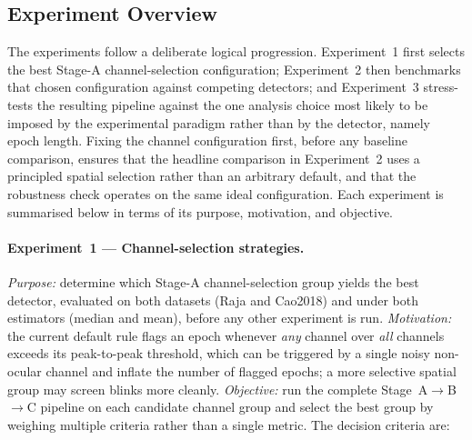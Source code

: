 \subsection{Experiment Overview}
\label{sec:experiment_overview}

The experiments follow a deliberate logical progression. Experiment~1 first selects the
best Stage-A channel-selection configuration; Experiment~2 then benchmarks that chosen
configuration against competing detectors; and Experiment~3 stress-tests the resulting
pipeline against the one analysis choice most likely to be imposed by the experimental
paradigm rather than by the detector, namely epoch length. Fixing the channel
configuration first, before any baseline comparison, ensures that the headline comparison
in Experiment~2 uses a principled spatial selection rather than an arbitrary default, and
that the robustness check operates on the same ideal configuration. Each experiment is
summarised below in terms of its purpose, motivation, and objective.

\paragraph{Experiment~1 --- Channel-selection strategies.}
\textit{Purpose:} determine which Stage-A channel-selection group yields the best detector,
evaluated on both datasets (Raja and Cao2018) and under both estimators (median and mean),
before any other experiment is run.
\textit{Motivation:} the current default rule flags an epoch whenever \emph{any} channel
over \emph{all} channels exceeds its peak-to-peak threshold, which can be triggered by a
single noisy non-ocular channel and inflate the number of flagged epochs; a more selective
spatial group may screen blinks more cleanly.
\textit{Objective:} run the complete Stage~A$\to$B$\to$C pipeline on each candidate
channel group and select the best group by weighing multiple criteria rather than a single
metric. The decision criteria are:

